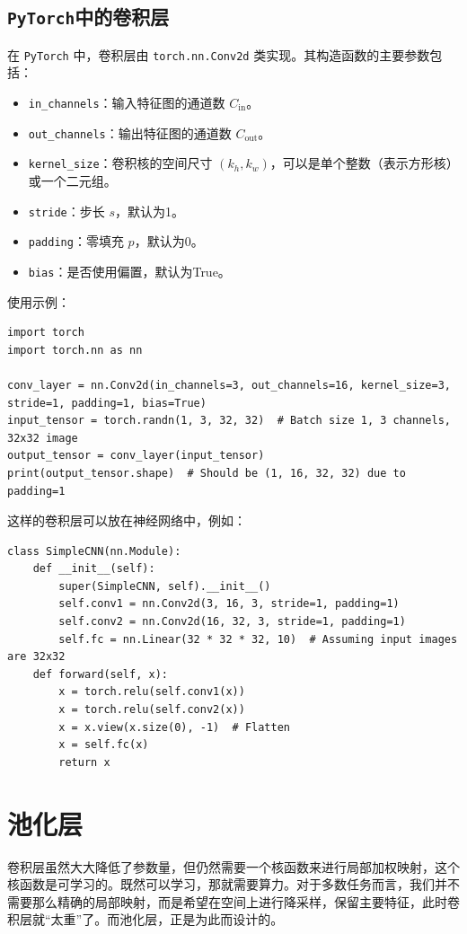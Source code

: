 \subsection{\texttt{PyTorch}中的卷积层}
在 \texttt{PyTorch} 中，卷积层由 \texttt{torch.nn.Conv2d} 类实现。其构造函数的主要参数包括：
\begin{itemize}
    \item \texttt{in_channels}：输入特征图的通道数 $C_{\text{in}}$。
    \item \texttt{out_channels}：输出特征图的通道数 $C_{\text{out}}$。
    \item \texttt{kernel_size}：卷积核的空间尺寸 $(k_h, k_w)$，可以是单个整数（表示方形核）或一个二元组。
    \item \texttt{stride}：步长 $s$，默认为1。
    \item \texttt{padding}：零填充 $p$，默认为0。
    \item \texttt{bias}：是否使用偏置，默认为True。
\end{itemize}
使用示例：
\begin{verbatim}
import torch
import torch.nn as nn

conv_layer = nn.Conv2d(in_channels=3, out_channels=16, kernel_size=3, stride=1, padding=1, bias=True)
input_tensor = torch.randn(1, 3, 32, 32)  # Batch size 1, 3 channels, 32x32 image
output_tensor = conv_layer(input_tensor)
print(output_tensor.shape)  # Should be (1, 16, 32, 32) due to padding=1
\end{verbatim}

这样的卷积层可以放在神经网络中，例如：
\begin{verbatim}
class SimpleCNN(nn.Module):
    def __init__(self):
        super(SimpleCNN, self).__init__()
        self.conv1 = nn.Conv2d(3, 16, 3, stride=1, padding=1)
        self.conv2 = nn.Conv2d(16, 32, 3, stride=1, padding=1)
        self.fc = nn.Linear(32 * 32 * 32, 10)  # Assuming input images are 32x32
    def forward(self, x):
        x = torch.relu(self.conv1(x))
        x = torch.relu(self.conv2(x))
        x = x.view(x.size(0), -1)  # Flatten
        x = self.fc(x)
        return x
\end{verbatim}

\section{池化层}

卷积层虽然大大降低了参数量，但仍然需要一个核函数来进行局部加权映射，这个核函数是可学习的。既然可以学习，那就需要算力。对于多数任务而言，我们并不需要那么精确的局部映射，而是希望在空间上进行降采样，保留主要特征，此时卷积层就“太重”了。而池化层，正是为此而设计的。

